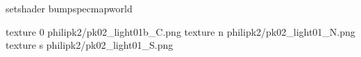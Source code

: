 setshader bumpspecmapworld

texture 0 philipk2/pk02_light01b_C.png
texture n philipk2/pk02_light01_N.png
texture s philipk2/pk02_light01_S.png

